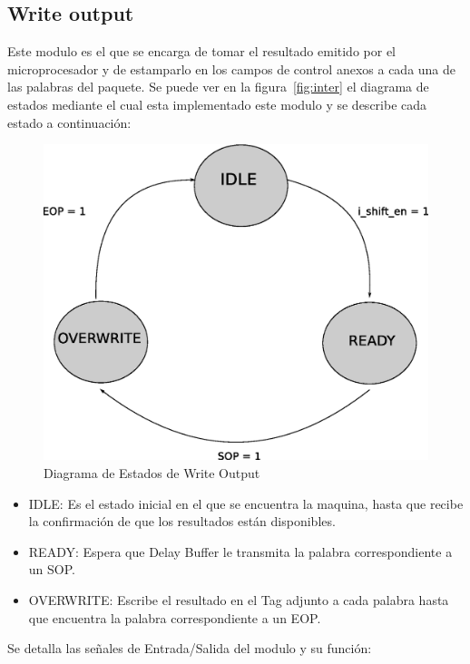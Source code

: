 \newpage

\subsection{Write output}

Este modulo es el que se encarga de tomar el resultado emitido por el microprocesador y de estamparlo en los campos de control anexos a cada una de las palabras del paquete. Se puede ver en la figura~\ref{fig:inter} el diagrama de estados mediante el cual esta implementado este modulo y se describe cada estado a continuación:

\begin{figure}[H]
  \centering
	\includegraphics[scale=0.45]{3-arquitectura/graf/estwritecompleto.eps}
  \caption{Diagrama de Estados de Write Output}
  \label{fig:estuplink}
\end{figure}

\begin{itemize}
	\item IDLE: Es el estado inicial en el que se encuentra la maquina, hasta que recibe la confirmación de que los resultados están disponibles.
	\item READY: Espera que Delay Buffer le transmita la palabra correspondiente a un SOP. 
	\item OVERWRITE: Escribe el resultado en el Tag adjunto a cada palabra hasta que encuentra la palabra correspondiente a un EOP. 
\end{itemize}

Se detalla las señales de Entrada/Salida del modulo y su función:

